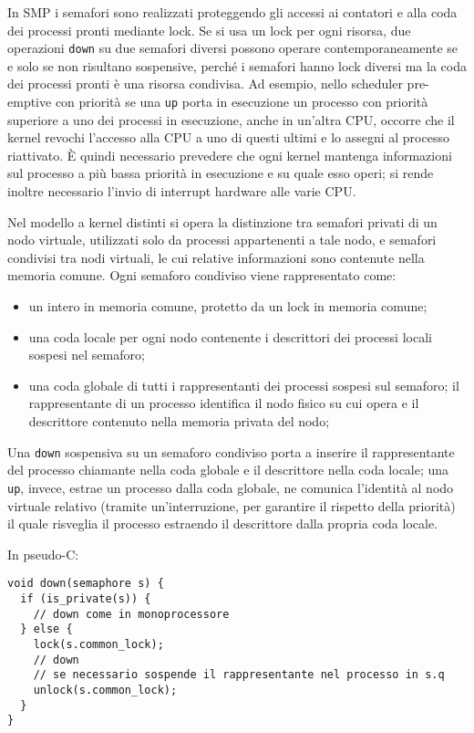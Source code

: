 \documentclass[answers, a4paper, 11pt]{exam}
\begin{document}
\begin{questions}
\begin{parts}
\begin{solution}
			In SMP i semafori sono realizzati proteggendo gli accessi ai contatori e alla coda dei processi pronti mediante lock.
			Se si usa un lock per ogni risorsa, due operazioni \texttt{down} su due semafori diversi possono operare contemporaneamente se e solo se non risultano sospensive, perché i semafori hanno lock diversi ma la coda dei processi pronti è una risorsa condivisa.
			Ad esempio, nello scheduler pre-emptive con priorità se una \texttt{up} porta in esecuzione un processo con priorità superiore a uno dei processi in esecuzione, anche in un'altra CPU, occorre che il kernel revochi l'accesso alla CPU a uno di questi ultimi e lo assegni al processo riattivato.
			È quindi necessario prevedere che ogni kernel mantenga informazioni sul processo a più bassa priorità in esecuzione e su quale esso operi; si rende inoltre necessario l'invio di interrupt hardware alle varie CPU.

			Nel modello a kernel distinti si opera la distinzione tra semafori privati di un nodo virtuale, utilizzati solo da processi appartenenti a tale nodo, e semafori condivisi tra nodi virtuali, le cui relative informazioni sono contenute nella memoria comune.
			Ogni semaforo condiviso viene rappresentato come:
			\begin{itemize}
				\item un intero in memoria comune, protetto da un lock in memoria comune;
				\item una coda locale per ogni nodo contenente i descrittori dei processi locali sospesi nel semaforo;
				\item una coda globale di tutti i rappresentanti dei processi sospesi sul semaforo; il rappresentante di un processo identifica il nodo fisico su cui opera e il descrittore contenuto nella memoria privata del nodo;
			\end{itemize}

			Una \texttt{down} sospensiva su un semaforo condiviso porta a inserire il rappresentante del processo chiamante nella coda globale e il descrittore nella coda locale; una \texttt{up}, invece, estrae un processo dalla coda globale, ne comunica l'identità al nodo virtuale relativo  (tramite un'interruzione, per garantire il rispetto della priorità) il quale risveglia il processo estraendo il descrittore dalla propria coda locale.

			In pseudo-C:
			\begin{verbatim}
void down(semaphore s) {
  if (is_private(s)) {
    // down come in monoprocessore
  } else {
    lock(s.common_lock);
    // down
    // se necessario sospende il rappresentante nel processo in s.q
    unlock(s.common_lock);
  }
}


\end{verbatim}
\end{solution}
\end{parts}
\end{questions}
\end{document}
